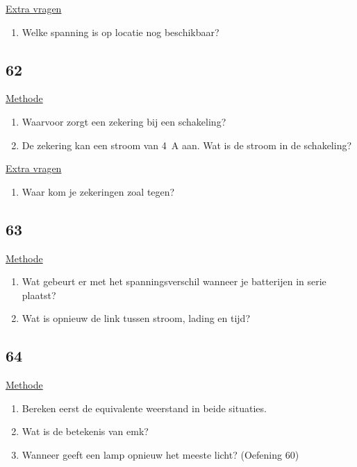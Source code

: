 \underline{Extra vragen}
\begin{enumerate}
	\item Welke spanning is op locatie nog beschikbaar?
\end{enumerate}



\subsection*{62}
\underline{Methode}
\begin{enumerate}
	\item Waarvoor zorgt een zekering bij een schakeling?
	\item De zekering kan een stroom van 4~A aan. Wat is de stroom in de schakeling?
\end{enumerate}

\underline{Extra vragen}
\begin{enumerate}
	\item Waar kom je zekeringen zoal tegen?
\end{enumerate}




\subsection*{63}
\underline{Methode}
\begin{enumerate}
	\item Wat gebeurt er met het spanningsverschil wanneer je batterijen in serie plaatst?
	\item Wat is opnieuw de link tussen stroom, lading en tijd? 
\end{enumerate}





\subsection*{64}
\underline{Methode}
\begin{enumerate}
	\item Bereken eerst de equivalente weerstand in beide situaties.
	\item Wat is de betekenis van emk?
	\item Wanneer geeft een lamp opnieuw het meeste licht? (Oefening 60)
\end{enumerate}












